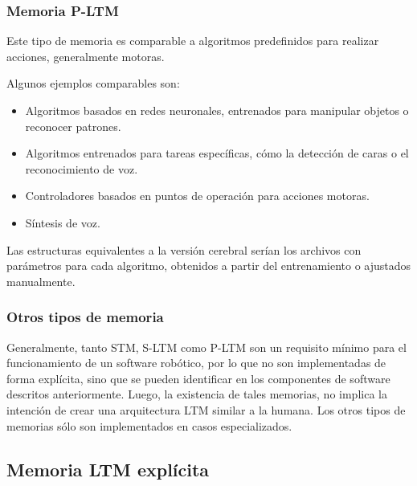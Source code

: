 \subsubsection{Memoria P-LTM}

Este tipo de memoria es comparable a algoritmos predefinidos para realizar acciones, generalmente motoras. 

Algunos ejemplos comparables son: 
\begin{itemize}[topsep=0pt]
\setlength\itemsep{0.2em}
\item Algoritmos basados en redes neuronales, entrenados para manipular objetos o reconocer patrones.
\item Algoritmos entrenados para tareas específicas, cómo la detección de caras o el reconocimiento de voz.
\item Controladores basados en puntos de operación para acciones motoras.
\item Síntesis de voz.
\end{itemize}

Las estructuras equivalentes a la versión cerebral serían los archivos con parámetros para cada algoritmo, obtenidos a partir del entrenamiento o ajustados manualmente.


\subsubsection{Otros tipos de memoria}

Generalmente, tanto STM, S-LTM como P-LTM son un requisito mínimo para el funcionamiento de un software robótico, por lo que no son implementadas de forma explícita, sino que se pueden identificar en los componentes de software descritos anteriormente. Luego, la existencia de tales memorias, no implica la intención de crear una arquitectura LTM similar a la humana. Los otros tipos de memorias sólo son implementados en casos especializados.



\subsection{Memoria LTM explícita}\label{sec:ltm_exp}




